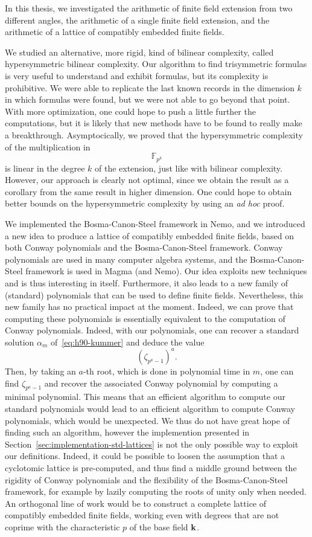 In this thesis, we investigated the arithmetic of finite field extension from
two different angles, the arithmetic of a single finite field extension, and the
arithmetic of a lattice of compatibly embedded finite fields.

We studied an alternative, more rigid, kind of bilinear complexity, called
hypersymmetric bilinear complexity. Our algorithm to find trisymmetric formulas
is very useful to understand and exhibit formulas, but its
complexity is prohibitive. We were able to replicate the last known records in
the dimension $k$ in which formulas were found, but we were not able to go
beyond that point. With more optimization, one could hope to push a
little further the computations, but it is likely that new methods have to be
found to really make a breakthrough. Asymptocically, we proved that the
hypersymmetric complexity of the multiplication in
\[
  \mathbb{F}_{p^{k}}
\]
is linear in the degree $k$ of the extension, just like with bilinear
complexity. However, our approach is clearly not optimal, since we obtain the
result as a corollary from the same result in higher dimension. One could hope
to obtain better bounds on the hypersymmetric complexity by using an
\emph{ad hoc} proof.

We implemented the Bosma-Canon-Steel framework in Nemo, and we introduced a
new idea to produce a lattice of
compatibly embedded finite fields, based on both Conway polynomials and the
Bosma-Canon-Steel framework. Conway polynomials are used in many computer
algebra systems, and the Bosma-Canon-Steel framework is used in Magma (and Nemo).
Our idea exploits new techniques and is thus
interesting in itself. Furthermore, it also leads to a new family of (standard)
polynomials that can be used to define finite fields. Nevertheless, this new
family has no practical impact at the moment. Indeed, we can prove that
computing these polynomials is essentially equivalent to the computation of
Conway polynomials. Indeed, with our polynomials, one can recover a standard
solution $\alpha_m$ of~\eqref{eq:h90-kummer} and deduce the value
\[
  (\zeta_{p^a-1})^a.
\]
Then, by taking an $a$-th root, which is done in polynomial time in $m$, one can
find $\zeta_{p^a-1}$ and recover the associated Conway polynomial by computing a
minimal polynomial. This means that an efficient algorithm to compute our
standard polynomials would lead to an efficient algorithm to compute Conway
polynomials, which would be unexpected. We thus do not have great hope of
finding such an algorithm, however the implemention presented in
Section~\ref{sec:implementation-std-lattices} is not the only possible way to
exploit our definitions. Indeed, it could be possible to loosen the assumption
that a cyclotomic lattice is pre-computed, and thus find a middle ground between
the rigidity of Conway polynomials and the flexibility of the Bosma-Canon-Steel
framework, for example by lazily computing the roots of unity only when needed.
An orthogonal line of work would be to construct a complete lattice of
compatibly embedded finite fields, \ie working even with degrees that are not
coprime with the characteristic $p$ of the base field $\mathbf{k}$.
